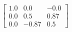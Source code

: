 \documentclass[preview]{standalone}
\begin{document}
\begin{align*}
\left[ \begin{array}{ccc}1.0 & 0.0 & -0.0 \\ 0.0 & 0.5 & 0.87 \\ 0.0 & -0.87 & 0.5\end{array} \right]
\end{align*}
\end{document}
